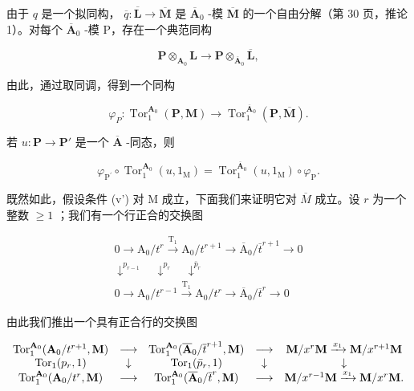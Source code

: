 由于 \(q\) 是一个拟同构， \(\overline{q}:\overline{\mathbf{L}}\to\overline{\mathbf{M}}\) 是 \(\overline{\mathbf{A}}_{0}\) -模 \(\overline{\mathbf{M}}\) 的一个自由分解（第 30 页，推论 1）。对每个 \(\overline{\mathbf{A}}_{0}\) -模 P，存在一个典范同构

\[
\mathbf {P} \otimes_ {\mathbf {A} _ {0}} \mathbf {L} \rightarrow \mathbf {P} \otimes_ {\overline {{{\mathbf {A}}}} _ {0}} \overline {{{\mathbf {L}}}},
\]

由此，通过取同调，得到一个同构

\[
\varphi_ {P}: \operatorname{Tor} _ {1} ^ {\mathbf {A} _ {0}} (\mathbf {P}, \mathbf {M}) \rightarrow \operatorname{Tor} _ {1} ^ {\overline {{\mathbf {A}}} _ {0}} (\mathbf {P}, \overline {{\mathbf {M}}}).
\]

若 \(u: \mathbf{P} \to \mathbf{P}'\) 是一个 \(\overline{\mathbf{A}}\) -同态，则

\[
\varphi_ {\mathrm{P} ^ {\prime}} \circ \operatorname{Tor} _ {1} ^ {\mathbf {A} _ {0}} (u, 1 _ {\mathrm{M}}) = \operatorname{Tor} _ {1} ^ {\overline {{\mathbf {A}}} _ {0}} (u, 1 _ {\mathrm{M}}) \circ \varphi_ {\mathrm{P}}.
\]

既然如此，假设条件 (v') 对 M 成立，下面我们来证明它对 \(\overline{M}\) 成立。设 \(r\) 为一个整数 \(\geqslant 1\) ；我们有一个行正合的交换图

\[
\begin{array}{c} 0 \longrightarrow \mathrm{A} _ {0} / t ^ {r} \xrightarrow {\mathrm{T} _ {1}} \mathrm{A} _ {0} / t ^ {r + 1} \longrightarrow \overline {{\mathrm{A}}} _ {0} / \overline {{t}} ^ {r + 1} \longrightarrow 0 \\ \downarrow^ {p _ {r - 1}} \quad \downarrow^ {p _ {r}} \quad \downarrow^ {\bar {p} _ {r}} \\ 0 \longrightarrow \mathrm{A} _ {0} / t ^ {r - 1} \xrightarrow {\mathrm{T} _ {1}} \mathrm{A} _ {0} / t ^ {r} \longrightarrow \overline {{\mathrm{A}}} _ {0} / \overline {{t}} ^ {r} \longrightarrow 0 \end{array}
\]

由此我们推出一个具有正合行的交换图

\[
\begin{array}{c c c c c} \operatorname{Tor} _ {1} ^ {\mathbf {A} _ {0}} (\mathbf {A} _ {0} / t ^ {r + 1}, \mathbf {M}) & \longrightarrow & \operatorname{Tor} _ {1} ^ {\mathbf {A} _ {0}} (\overline {{\mathbf {A}}} _ {0} / \overline {{t}} ^ {r + 1}, \mathbf {M}) & \longrightarrow & \mathbf {M} / x ^ {r}   \mathbf {M} \xrightarrow {x _ {1}} \mathbf {M} / x ^ {r + 1}   \mathbf {M} \\ \operatorname{Tor} _ {1} (p _ {r}, 1) & \downarrow & \operatorname{Tor} _ {1} (\bar {p} _ {r}, 1) & \downarrow & \downarrow \\ \operatorname{Tor} _ {1} ^ {\mathbf {A} _ {0}} (\mathbf {A} _ {0} / t ^ {r}, \mathbf {M}) & \longrightarrow & \operatorname{Tor} _ {1} ^ {\mathbf {A} _ {0}} (\overline {{\mathbf {A}}} _ {0} / \overline {{t}} ^ {r}, \mathbf {M}) & \longrightarrow & \mathbf {M} / x ^ {r - 1}   \mathbf {M} \xrightarrow {x _ {1}} \mathbf {M} / x ^ {r}   \mathbf {M}. \end{array}
\]

